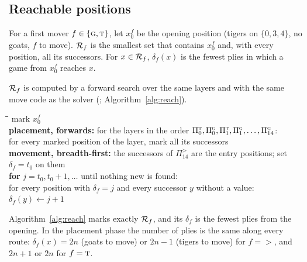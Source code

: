 \subsection{Reachable positions}

\begin{definition}
For a first mover $f \in \{\textsc{g}, \textsc{t}\}$, let $x_0^f$ be the opening position (tigers on $\{0, 3, 4\}$, no goats,
$f$ to move). $\mathcal{R}_f$ is the smallest set that contains $x_0^f$ and, with every position, all its
successors. For $x \in \mathcal{R}_f$, $\delta_f(x)$ is the fewest plies in which a game from $x_0^f$ reaches $x$.
\end{definition}

$\mathcal{R}_f$ is computed by a forward search over the same layers and with the same move code as the solver
(; Algorithm~\ref{alg:reach}).

\begin{algorithm}[H]
\caption{Reachable positions and their fewest plies, for first mover $f$}\label{alg:reach}
\begin{tabbing}
\hspace{1.6em}\=\hspace{1.6em}\=\hspace{1.6em}\=\kill
mark $x_0^f$ \\
\textbf{placement, forwards:} for the layers in the order $\Pi^{\textsc{t}}_0, \Pi^{\textsc{g}}_0, \Pi^{\textsc{t}}_1, \Pi^{\textsc{g}}_1, \dots, \Pi^{\textsc{g}}_{14}$: \\
\> for every marked position of the layer, mark all its successors \\
\textbf{movement, breadth-first:} the successors of $\Pi^{\gt}_{14}$ are the entry positions; set $\delta_f = t_0$ on them \\
\> \textbf{for} $j = t_0, t_0 + 1, \dots$ until nothing new is found: \\
\>\> for every position with $\delta_f = j$ and every successor $y$ without a value: $\delta_f(y) \leftarrow j + 1$
\end{tabbing}
\end{algorithm}

\begin{proposition}\label{prop:reach}
Algorithm~\ref{alg:reach} marks exactly $\mathcal{R}_f$, and its $\delta_f$ is the fewest plies from the opening.
In the placement phase the number of plies is the same along every route:
$\delta_f(x) = 2n$ (goats to move) or $2n - 1$ (tigers to move) for $f = \gt$, and $2n + 1$ or $2n$ for $f = \textsc{t}$.
\end{proposition}

